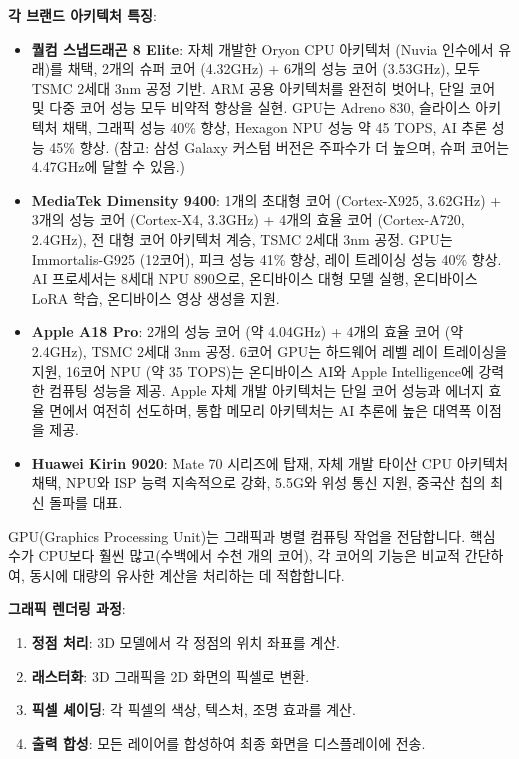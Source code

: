 \textbf{각 브랜드 아키텍처 특징}:

\begin{itemize}
  \item \textbf{퀄컴 스냅드래곤 8 Elite}: 자체 개발한 Oryon CPU 아키텍처 (Nuvia 인수에서 유래)를 채택, 2개의 슈퍼 코어 (4.32GHz) + 6개의 성능 코어 (3.53GHz), 모두 TSMC 2세대 3nm 공정 기반. ARM 공용 아키텍처를 완전히 벗어나, 단일 코어 및 다중 코어 성능 모두 비약적 향상을 실현. GPU는 Adreno 830, 슬라이스 아키텍처 채택, 그래픽 성능 40\% 향상, Hexagon NPU 성능 약 45 TOPS, AI 추론 성능 45\% 향상. (참고: 삼성 Galaxy 커스텀 버전은 주파수가 더 높으며, 슈퍼 코어는 4.47GHz에 달할 수 있음.)
  \item \textbf{MediaTek Dimensity 9400}: 1개의 초대형 코어 (Cortex-X925, 3.62GHz) + 3개의 성능 코어 (Cortex-X4, 3.3GHz) + 4개의 효율 코어 (Cortex-A720, 2.4GHz), 전 대형 코어 아키텍처 계승, TSMC 2세대 3nm 공정. GPU는 Immortalis-G925 (12코어), 피크 성능 41\% 향상, 레이 트레이싱 성능 40\% 향상. AI 프로세서는 8세대 NPU 890으로, 온디바이스 대형 모델 실행, 온디바이스 LoRA 학습, 온디바이스 영상 생성을 지원.
  \item \textbf{Apple A18 Pro}: 2개의 성능 코어 (약 4.04GHz) + 4개의 효율 코어 (약 2.4GHz), TSMC 2세대 3nm 공정. 6코어 GPU는 하드웨어 레벨 레이 트레이싱을 지원, 16코어 NPU (약 35 TOPS)는 온디바이스 AI와 Apple Intelligence에 강력한 컴퓨팅 성능을 제공. Apple 자체 개발 아키텍처는 단일 코어 성능과 에너지 효율 면에서 여전히 선도하며, 통합 메모리 아키텍처는 AI 추론에 높은 대역폭 이점을 제공.
  \item \textbf{Huawei Kirin 9020}: Mate 70 시리즈에 탑재, 자체 개발 타이산 CPU 아키텍처 채택, NPU와 ISP 능력 지속적으로 강화, 5.5G와 위성 통신 지원, 중국산 칩의 최신 돌파를 대표.
\end{itemize}


GPU(Graphics Processing Unit)는 그래픽과 병렬 컴퓨팅 작업을 전담합니다. 핵심 수가 CPU보다 훨씬 많고(수백에서 수천 개의 코어), 각 코어의 기능은 비교적 간단하여, 동시에 대량의 유사한 계산을 처리하는 데 적합합니다.

\textbf{그래픽 렌더링 과정}:

\begin{enumerate}
  \item \textbf{정점 처리}: 3D 모델에서 각 정점의 위치 좌표를 계산.
  \item \textbf{래스터화}: 3D 그래픽을 2D 화면의 픽셀로 변환.
  \item \textbf{픽셀 셰이딩}: 각 픽셀의 색상, 텍스처, 조명 효과를 계산.
  \item \textbf{출력 합성}: 모든 레이어를 합성하여 최종 화면을 디스플레이에 전송.
\end{enumerate}

